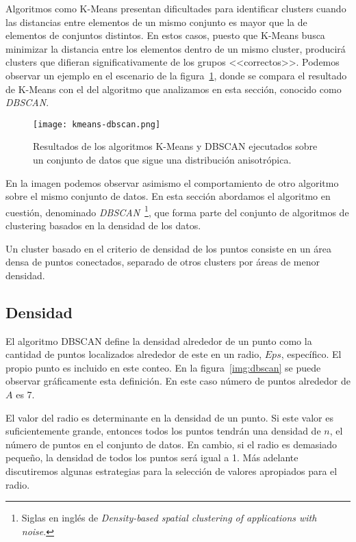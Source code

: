 Algoritmos como K-Means presentan dificultades para identificar clusters cuando las distancias entre elementos de un mismo conjunto es mayor que la de elementos de conjuntos distintos.
En estos casos, puesto que K-Means busca minimizar la distancia entre los elementos dentro de un mismo cluster, producirá clusters que difieran significativamente de los grupos <<correctos>>.
Podemos observar un ejemplo en el escenario de la figura~\ref{img:kmeans-dbscan}, donde se compara el resultado de K-Means con el del algoritmo que analizamos en esta sección, conocido como \textit{DBSCAN}.

\begin{figure}[!h]
    \centering
    \texttt{[image: kmeans-dbscan.png]}
    \caption{Resultados de los algoritmos K-Means y DBSCAN ejecutados sobre un conjunto de datos que sigue una distribución anisotrópica.}
    \label{img:kmeans-dbscan}
\end{figure}

En la imagen podemos observar asimismo el comportamiento de otro algoritmo sobre el mismo conjunto de datos.
En esta sección abordamos el algoritmo en cuestión, denominado \textit{DBSCAN}~\footnote{Siglas en inglés de \textit{Density-based spatial clustering of applications with noise}.}, que forma parte del conjunto de algoritmos de clustering basados en la densidad de los datos.

Un cluster basado en el criterio de densidad de los puntos consiste en un área densa de puntos conectados, separado de otros clusters por áreas de menor densidad.

\subsection{Densidad}\label{subsec:densidad}

El algoritmo DBSCAN define la densidad alrededor de un punto como la cantidad de puntos localizados alrededor de este en un radio, $Eps$, específico.
El propio punto es incluido en este conteo.
En la figura~\ref{img:dbscan} se puede observar gráficamente esta definición.
En este caso número de puntos alrededor de $A$ es 7.

El valor del radio es determinante en la densidad de un punto.
Si este valor es suficientemente grande, entonces todos los puntos tendrán una densidad de $n$, el número de puntos en el conjunto de datos.
En cambio, si el radio es demasiado pequeño, la densidad de todos los puntos será igual a 1.
Más adelante discutiremos algunas estrategias para la selección de valores apropiados para el radio.


